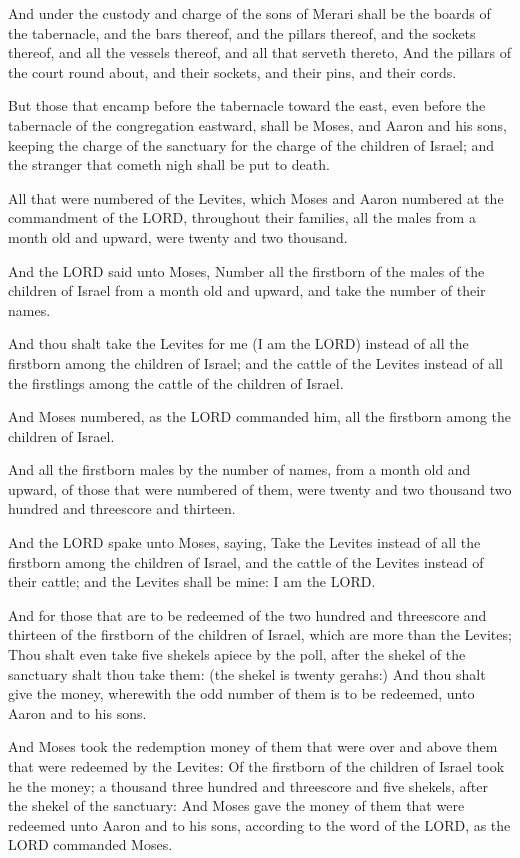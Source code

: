 \verse And under the custody and charge of the sons of Merari shall be
the boards of the tabernacle, and the bars thereof, and the pillars
thereof, and the sockets thereof, and all the vessels thereof, and all
that serveth thereto, \verse And the pillars of the court round about,
and their sockets, and their pins, and their cords.

\verse But those that encamp before the tabernacle toward the east, even
before the tabernacle of the congregation eastward, shall be Moses,
and Aaron and his sons, keeping the charge of the sanctuary for the
charge of the children of Israel; and the stranger that cometh nigh
shall be put to death.

\verse All that were numbered of the Levites, which Moses and Aaron
numbered at the commandment of the LORD, throughout their families,
all the males from a month old and upward, were twenty and two
thousand.

\verse And the LORD said unto Moses, Number all the firstborn of the
males of the children of Israel from a month old and upward, and take
the number of their names.

\verse And thou shalt take the Levites for me (I am the LORD) instead of
all the firstborn among the children of Israel; and the cattle of the
Levites instead of all the firstlings among the cattle of the children
of Israel.

\verse And Moses numbered, as the LORD commanded him, all the firstborn
among the children of Israel.

\verse And all the firstborn males by the number of names, from a month
old and upward, of those that were numbered of them, were twenty and
two thousand two hundred and threescore and thirteen.

\verse And the LORD spake unto Moses, saying, \verse Take the Levites
instead of all the firstborn among the children of Israel, and the
cattle of the Levites instead of their cattle; and the Levites shall
be mine: I am the LORD.

\verse And for those that are to be redeemed of the two hundred and
threescore and thirteen of the firstborn of the children of Israel,
which are more than the Levites; \verse Thou shalt even take five
shekels apiece by the poll, after the shekel of the sanctuary shalt
thou take them: (the shekel is twenty gerahs:) \verse And thou shalt
give the money, wherewith the odd number of them is to be redeemed,
unto Aaron and to his sons.

\verse And Moses took the redemption money of them that were over and
above them that were redeemed by the Levites: \verse Of the firstborn of
the children of Israel took he the money; a thousand three hundred and
threescore and five shekels, after the shekel of the sanctuary: \verse
And Moses gave the money of them that were redeemed unto Aaron and to
his sons, according to the word of the LORD, as the LORD commanded
Moses.


